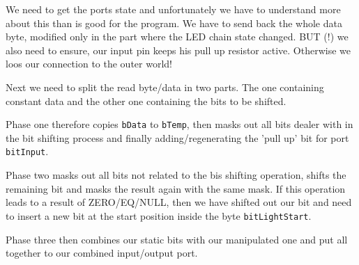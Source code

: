 We need to get the ports state and unfortunately we have to understand more about this than is good for the program. We have to send back the whole data byte, modified only in the part where the LED chain state changed. BUT (!) we also need to ensure, our input pin keeps his pull up resistor active. Otherwise we loos our connection to the outer world!

Next we need to split the read byte/data in two parts. The one containing constant data and the other one containing the bits to be shifted.

Phase one therefore copies \texttt{bData} to \texttt{bTemp}, then masks out all bits dealer with in the bit shifting process and finally adding/regenerating the 'pull up' bit for port \texttt{bitInput}.

Phase two masks out all bits not related to the bis shifting operation, shifts the remaining bit and masks the result again with the same mask. If this operation leads to a result of ZERO/EQ/NULL, then we have shifted out our bit and need to insert a new bit at the start position inside the byte \texttt{bitLightStart}.

Phase three then combines our static bits with our manipulated one and put all together to our combined input/output port.

